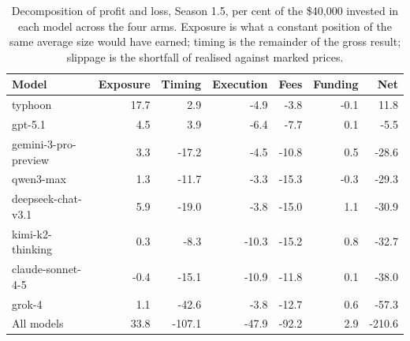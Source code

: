 \begin{table}[ht]
\centering
\small
\caption{Decomposition of profit and loss, Season 1.5, per cent of the \$40{,}000 invested in each model across the four arms. Exposure is what a constant position of the same average size would have earned; timing is the remainder of the gross result; slippage is the shortfall of realised against marked prices.}
\label{tab:pnl}
\begin{tabular}{lrrrrrr}
\toprule
Model & Exposure & Timing & Execution & Fees & Funding & Net \\
\midrule
typhoon & 17.7 & 2.9 & -4.9 & -3.8 & -0.1 & 11.8 \\
gpt-5.1 & 4.5 & 3.9 & -6.4 & -7.7 & 0.1 & -5.5 \\
gemini-3-pro-preview & 3.3 & -17.2 & -4.5 & -10.8 & 0.5 & -28.6 \\
qwen3-max & 1.3 & -11.7 & -3.3 & -15.3 & -0.3 & -29.3 \\
deepseek-chat-v3.1 & 5.9 & -19.0 & -3.8 & -15.0 & 1.1 & -30.9 \\
kimi-k2-thinking & 0.3 & -8.3 & -10.3 & -15.2 & 0.8 & -32.7 \\
claude-sonnet-4-5 & -0.4 & -15.1 & -10.9 & -11.8 & 0.1 & -38.0 \\
grok-4 & 1.1 & -42.6 & -3.8 & -12.7 & 0.6 & -57.3 \\
\midrule
All models & 33.8 & -107.1 & -47.9 & -92.2 & 2.9 & -210.6 \\
\bottomrule
\end{tabular}
\end{table}
